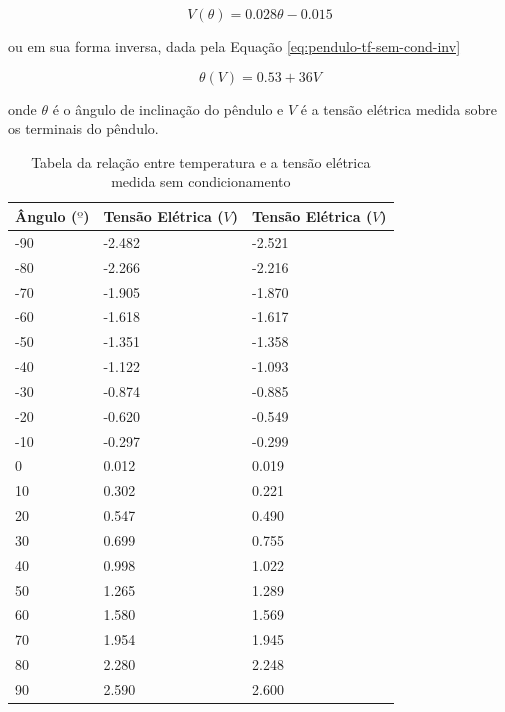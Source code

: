 \documentclass[a4paper]{instrumentacao}
\begin{document}
\begin{equation}
	V(\theta) = 0.028 \theta - 0.015
	\label{eq:pendulo-tf-sem-cond}
\end{equation}

\noindent 
ou em sua forma inversa, dada pela Equação \ref{eq:pendulo-tf-sem-cond-inv}

\begin{equation}
	\theta(V) = 0.53 + 36 V
	\label{eq:pendulo-tf-sem-cond-inv}
\end{equation}

\noindent
onde $\theta$ é o ângulo de inclinação do pêndulo e $V$ é a tensão elétrica medida sobre os terminais do pêndulo.

\begin{table}[]
\centering
\caption{Tabela da relação entre temperatura e a tensão elétrica medida sem condicionamento}
\begin{tabular}{|l|l|l|}
 \hline
 \textbf{Ângulo ($º$)} & \textbf{Tensão Elétrica ($V$)} & \textbf{Tensão Elétrica ($V$)} \\ \hline
 
 -90 & -2.482 & -2.521 	\\ \hline
 -80 & -2.266 & -2.216 	\\ \hline
 -70 & -1.905 & -1.870	\\ \hline
 -60 & -1.618 & -1.617 	\\ \hline
 -50 & -1.351 & -1.358 	\\ \hline
 -40 & -1.122 & -1.093 	\\ \hline
 -30 & -0.874 & -0.885 	\\ \hline
 -20 & -0.620 & -0.549 	\\ \hline
 -10 & -0.297 & -0.299 	\\ \hline
 0 & 0.012 & 0.019 		\\ \hline
 10 & 0.302 & 0.221 	\\ \hline
 20 & 0.547 & 0.490 	\\ \hline
 30 & 0.699 & 0.755 	\\ \hline
 40 & 0.998 & 1.022 	\\ \hline
 50 & 1.265 & 1.289 	\\ \hline
 60 & 1.580 & 1.569 	\\ \hline
 70 & 1.954 & 1.945 	\\ \hline
 80 & 2.280 & 2.248 	\\ \hline
 90 & 2.590 & 2.600 	\\ \hline
 
\end{tabular}
\label{tab:pendulo-calibracao}
\end{table}
\end{document}

